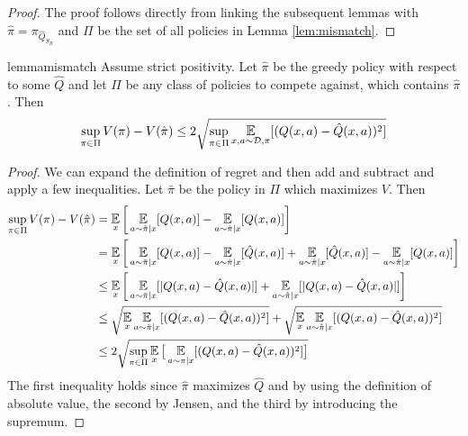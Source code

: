 \label{app:value}

\reduction*

\begin{proof}
The proof follows directly from linking the subsequent lemmas with $ \hat \pi = \pi_{\hat Q_{S_B}}$ and $ \Pi$ be the set of all policies in Lemma \ref{lem:mismatch}.
\end{proof}



\begin{restatable}{lemma}{mismatch}\label{lem:mismatch}
Assume strict positivity. Let $\hat \pi$ be the greedy policy with respect to some $ \hat Q $ and let $ \Pi$ be any class of policies to compete against, which contains $ \hat \pi$. Then
\begin{align}
    \sup_{\pi\in \Pi} V(\pi) - V(\hat\pi) \leq 2 \sqrt{\sup_{\pi\in \Pi} \E_{x,a \sim \mathcal{D}, \pi}[ (Q(x,a) - \hat Q(x,a))^2]}
\end{align}
\end{restatable}


\begin{proof}
We can expand the definition of regret and then add and subtract and apply a few inequalities. Let $ \bar \pi $ be the policy in $ \Pi $ which maximizes $ V$. Then
\begin{align}
    \sup_{\pi\in \Pi}V(\pi) - V(\hat \pi) &=  \E_x\bigg[\E_{a\sim \bar\pi|x}[Q(x,a)] - \E_{a\sim\hat\pi|x}[Q(x,a)]\bigg]\\
    &= \E_x\bigg[\E_{a\sim \bar\pi|x}[ Q(x,a)] - \E_{a\sim\hat\pi|x}[\hat Q(x,a)] + \E_{a\sim\hat\pi|x}[\hat Q(x,a)] - \E_{a\sim\hat\pi|x}[Q(x,a)]\bigg]\\
    &\leq \E_x\bigg[\E_{a\sim \bar\pi|x}[| Q(x,a) -\hat Q(x,a)|] + \E_{a\sim\hat\pi|x}[|Q(x,a)-\hat Q(x,a)|]\bigg]\\
    &\leq \sqrt{\E_x\E_{a\sim \bar\pi|x}[(Q(x,a) -\hat Q(x,a))^2]} + \sqrt{\E_x\E_{a\sim \hat\pi|x}[(Q(x,a) -\hat Q(x,a))^2]} \\
    &\leq 2  \sqrt{ \sup_{\pi\in \Pi}\E_x\big[\E_{a\sim \pi|x}[(Q(x,a)-  \hat Q(x,a))^2]\big]}
\end{align}
The first inequality holds since $ \hat \pi $ maximizes $ \hat Q$ and by using the definition of absolute value, the second by Jensen, and the third by introducing the supremum.
\end{proof}

